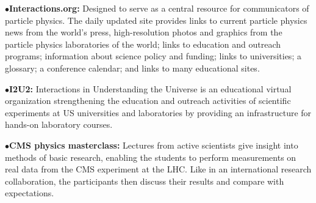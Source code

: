 \medskip

\item{$\bullet$}{\bf Interactions.org:} 
Designed to serve as a central resource for communicators of particle physics. The daily updated site provides links to current particle physics news from the world's press, high-resolution photos and graphics from the particle physics laboratories of the world; links to education and outreach programs; information about science policy and funding; links to universities; a glossary; a conference calendar; and links to many educational sites.
	\item{}

\medskip

\item{$\bullet$}{\bf I2U2:}
Interactions in Understanding the Universe is an educational virtual organization strengthening the education and outreach activities of scientific experiments at US universities and laboratories by providing an infrastructure for hands-on laboratory courses.
	\item{}


\medskip
\medskip









\medskip

\item{$\bullet$}{\bf CMS physics masterclass:}
Lectures from active scientists give insight into methods of basic research, enabling the students to perform measurements on real data from the CMS experiment at the LHC. Like in an international research collaboration, the participants then discuss their results and compare with expectations.
	\item{}

